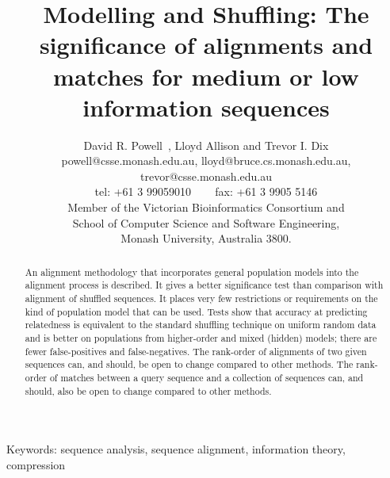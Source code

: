 \documentclass[a4paper,11pt,oneside]{article}
\begin{document}
\title{Modelling and Shuffling: The significance of alignments and matches for
medium or low information sequences}

\author{
  David R. Powell\footnotemark[1]~, Lloyd Allison and Trevor I. Dix \\
{\small powell@csse.monash.edu.au, lloyd@bruce.cs.monash.edu.au, trevor@csse.monash.edu.au} \\
{\small tel: +61 3 99059010 ~~~ fax: +61 3 9905 5146} \\
  Member of the Victorian Bioinformatics Consortium and \\
  School of Computer Science and Software Engineering, \\
  Monash University, Australia 3800.}

\renewcommand{\thefootnote}{\fnsymbol{footnote}}
\renewcommand{\thefootnote}{\arabic{footnote}}

\date{}
\maketitle



\begin{abstract}
An alignment methodology that incorporates general
population models into the alignment process is described.
It gives a better significance test than comparison with alignment of shuffled
sequences.
It places very few restrictions or requirements on the kind of
population model that can be used.
Tests show that accuracy at predicting relatedness is equivalent to
the standard shuffling technique on uniform random data and
is better on populations from higher-order and mixed (hidden) models;
there are fewer false-positives and false-negatives.
The rank-order of alignments of two given sequences can,
and should, be open to change compared to other methods.
The rank-order of matches between a query sequence and a collection of
sequences can, and should, also be open to change compared to other methods. 
\end{abstract}

{\small Keywords: sequence analysis, sequence alignment, information theory, compression}
\end{document}

